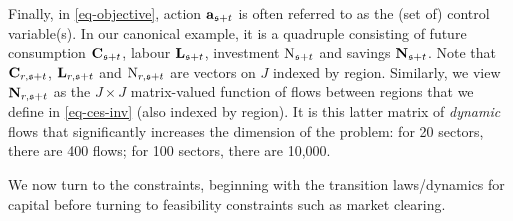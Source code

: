 \documentclass[12pt,a4paper,twoside, draft]{article}
\begin{document}
Finally, in \eqref{eq-objective}, action $\mathbf{a}_{\mathfrak{s} + t}$ is often referred to as
the (set of) control variable(s).
In our canonical example, it is a quadruple consisting of future consumption
$\mathbf{C}_{\mathfrak{s} + t}$, labour $\mathbf{L}_{\mathfrak{s} + t}$, investment
$\textup{N}_{\mathfrak{s} + t}$ and savings $\mathbf{N}_{\mathfrak{s} + t}$.
Note that $\mathbf{C}_{r, \mathfrak{s} + t}$, $\mathbf{L}_{r, \mathfrak{s} + t}$ and
$\textup{N}_{r, \mathfrak{s} + t}$ are vectors on $J$ indexed by region.
Similarly, we view $\mathbf{N}_{r, \mathfrak{s} + t}$ as the $J\times J$ matrix-valued
function of flows between regions that we define in \eqref{eq-ces-inv} (also
indexed by region).
It is this latter matrix of \emph{dynamic} flows that significantly increases
the dimension of the problem: for 20 sectors, there are 400 flows; for 100
sectors, there are 10,000.

We now turn to the constraints, beginning with the transition laws/dynamics for
capital before turning to feasibility constraints such as market clearing.
\end{document}
